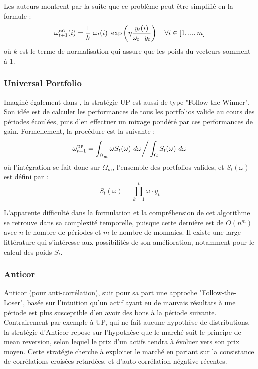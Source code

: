\documentclass[a4paper, 10pt]{article}
\begin{document}
Les auteurs montrent par la suite que ce problème peut être simplifié en la formule :
\begin{equation}
    \omega_{t+1}^{\text{\tiny EG}}(i) = \frac{1}{k} \ \omega_{t}(i) \ \exp \left(\eta \frac{y_{t}(i)}{\omega_{t} \cdot y_t} \right) \quad \forall i \in [1, ..., m]
\end{equation}
où $k$ est le terme de normalisation qui assure que les poids du vecteurs somment à 1.

\subsubsection{Universal Portfolio}
\label{sec:theorie_etude_up}

Imaginé également dans \cite{Cover1991}, la stratégie UP est aussi de type "Follow-the-Winner". Son idée est de calculer les performances de tous les portfolios valide au cours des périodes écoulées, puis d'en effectuer un mixage pondéré par ces performances de gain. Formellement, la procédure est la suivante :
\begin{equation}
    \omega_{t+1}^{\text{\tiny UP}} = \int_{\Omega_m} \omega S_t(\omega) \ d\omega \bigg/ \int_{\Omega} S_t(\omega) \ d\omega
\end{equation}
où l'intégration se fait donc sur $\Omega_m$, l'ensemble des portfolios valides, et $S_t(\omega)$ est défini par :
\begin{equation}
    S_t(\omega) = \prod_{k=1}^{t} \omega \cdot y_t
\end{equation}

L'apparente difficulté dans la formulation et la compréhension de cet algorithme se retrouve dans sa complexité temporelle, puisque cette dernière est de $O(n^m)$ avec $n$ le nombre de périodes et $m$ le nombre de monnaies. Il existe une large littérature qui s'intéresse aux possibilités de son amélioration, notamment pour le calcul des poids $S_t$.

\subsubsection{Anticor}
\label{sec:theorie_etude_anticor}

Anticor (pour anti-corrélation), suit pour sa part une approche "Follow-the-Loser", basée sur l'intuition qu'un actif ayant eu de mauvais résultats à une période est plus susceptible d'en avoir des bons à la période suivante. Contrairement par exemple à UP, qui ne fait aucune hypothèse de distributions, la stratégie d'Anticor repose sur l'hypothèse que le marché suit le principe de mean reversion, selon lequel le prix d'un actifs tendra à évoluer vers son prix moyen. Cette stratégie cherche à exploiter le marché en pariant sur la consistance de corrélations croisées retardées, et d'auto-corrélation négative récentes.
\end{document}
